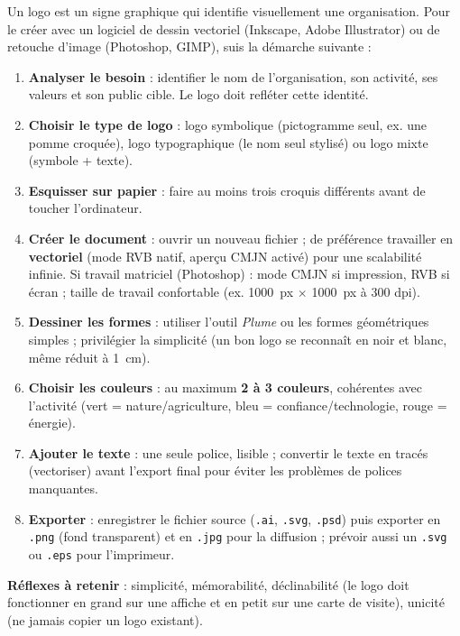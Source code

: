 \documentclass[11pt]{article}
\newcommand{\cle}[1]{{\popxbold\color{popdark}#1}}
\begin{document}
\begin{methode}
Un logo est un signe graphique qui identifie visuellement une organisation. Pour le créer avec un logiciel de dessin vectoriel (Inkscape, Adobe Illustrator) ou de retouche d'image (Photoshop, GIMP), suis la démarche suivante :
\begin{enumerate}
\item \textbf{Analyser le besoin} : identifier le nom de l'organisation, son activité, ses valeurs et son public cible. Le logo doit refléter cette identité.
\item \textbf{Choisir le type de logo} : logo \cle{symbolique} (pictogramme seul, ex. une pomme croquée), logo \cle{typographique} (le nom seul stylisé) ou logo \cle{mixte} (symbole + texte).
\item \textbf{Esquisser sur papier} : faire au moins trois croquis différents avant de toucher l'ordinateur.
\item \textbf{Créer le document} : ouvrir un nouveau fichier ; de préférence travailler en \textbf{vectoriel} (mode RVB natif, aperçu CMJN activé) pour une scalabilité infinie. Si travail matriciel (Photoshop) : mode \cle{CMJN} si impression, \cle{RVB} si écran ; taille de travail confortable (ex. \SI{1000}{px} $\times$ \SI{1000}{px} à 300 dpi).
\item \textbf{Dessiner les formes} : utiliser l'outil \emph{Plume} ou les formes géométriques simples ; privilégier la simplicité (un bon logo se reconnaît en noir et blanc, même réduit à \SI{1}{cm}).
\item \textbf{Choisir les couleurs} : au maximum \textbf{2 à 3 couleurs}, cohérentes avec l'activité (vert = nature/agriculture, bleu = confiance/technologie, rouge = énergie).
\item \textbf{Ajouter le texte} : une seule police, lisible ; convertir le texte en tracés (vectoriser) avant l'export final pour éviter les problèmes de polices manquantes.
\item \textbf{Exporter} : enregistrer le fichier source (\texttt{.ai}, \texttt{.svg}, \texttt{.psd}) puis exporter en \texttt{.png} (fond transparent) et en \texttt{.jpg} pour la diffusion ; prévoir aussi un \texttt{.svg} ou \texttt{.eps} pour l'imprimeur.
\end{enumerate}
\textbf{Réflexes à retenir} : simplicité, mémorabilité, déclinabilité (le logo doit fonctionner en grand sur une affiche et en petit sur une carte de visite), unicité (ne jamais copier un logo existant).
\end{methode}
\end{document}
